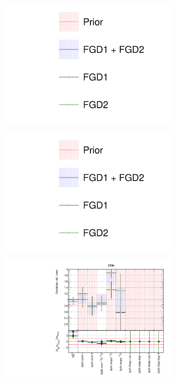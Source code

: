 \begin{figure}
\centering
\begin{subfigure}{0.3\textwidth}
  \centering
  \includegraphics[width=1.0\linewidth, trim={5mm  90mm 0mm 0mm}, clip]{figs/fgdfits_leg}
\end{subfigure}
\begin{subfigure}{0.3\textwidth}
  \centering
  \includegraphics[width=1.0\linewidth, trim={5mm  0mm 0mm 95mm}, clip]{figs/fgdfits_leg}
\end{subfigure}
\begin{subfigure}{0.49\textwidth}
  \centering
  \includegraphics[width=0.9\linewidth]{figs/fgdfitsxsec_1}

\end{subfigure}
\end{figure}
